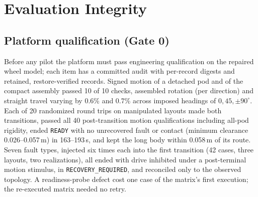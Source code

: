 \documentclass[conference]{IEEEtran}
\begin{document}
\section{Evaluation Integrity}
\label{sec:integrity}

\subsection{Platform qualification (Gate 0)}
Before any pilot the platform must pass engineering qualification on the repaired wheel model; each item has a committed audit with per-record digests and retained, restore-verified records. Signed motion of a detached pod and of the compact assembly passed 10 of 10 checks, assembled rotation (per direction) and straight travel varying by 0.6\% and 0.7\% across imposed headings of $0, 45, \pm 90^\circ$. Each of 20 randomized round trips on manipulated layouts made both transitions, passed all 40 post-transition motion qualifications including all-pod rigidity, ended \texttt{READY} with no unrecovered fault or contact (minimum clearance 0.026--0.057\,m) in 163--193\,s, and kept the long body within 0.058\,m of its route. Seven fault types, injected six times each into the first transition (42 cases, three layouts, two realizations), all ended with drive inhibited under a post-terminal motion stimulus, in \texttt{RECOVERY\_REQUIRED}, and reconciled only to the observed topology. A readiness-probe defect cost one case of the matrix's first execution; the re-executed matrix needed no retry.
\end{document}
